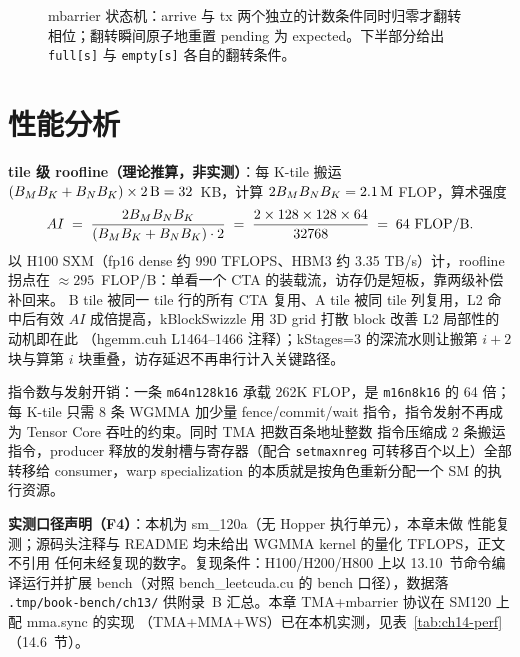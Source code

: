 \begin{figure}[htbp]
\caption{mbarrier 状态机：arrive 与 tx 两个独立的计数条件同时归零才翻转相位；翻转瞬间原子地重置 pending 为 expected。下半部分给出 \texttt{full[s]} 与 \texttt{empty[s]} 各自的翻转条件。}
\label{fig:13-3}
\end{figure}

\section{性能分析}

\textbf{tile 级 roofline（理论推算，非实测）}：每 K-tile 搬运
$(B\sb{M} B\sb{K} + B\sb{N} B\sb{K}) \times 2\,\mathrm{B} = 32$~KB，计算
$2 B\sb{M} B\sb{N} B\sb{K} = 2.1\,\mathrm{M}$ FLOP，算术强度
\begin{equation}
  AI \;=\; \frac{2 B\sb{M} B\sb{N} B\sb{K}}
  {(B\sb{M} B\sb{K} + B\sb{N} B\sb{K}) \cdot 2}
  \;=\; \frac{2 \times 128 \times 128 \times 64}{32768}
  \;=\; 64 \ \mathrm{FLOP/B} .
\end{equation}
以 H100 SXM（fp16 dense 约 990 TFLOPS、HBM3 约 3.35 TB/s）计，roofline 拐点在
$\approx 295$~FLOP/B：单看一个 CTA 的装载流，访存仍是短板，靠两级补偿补回来。
B tile 被同一 tile 行的所有 CTA 复用、A tile 被同 tile 列复用，L2 命中后有效
$AI$ 成倍提高，kBlockSwizzle 用 3D grid 打散 block 改善 L2 局部性的动机即在此
（hgemm.cuh L1464--1466 注释）；kStages=3 的深流水则让搬第 $i{+}2$ 块与算第
$i$ 块重叠，访存延迟不再串行计入关键路径。

指令数与发射开销：一条 \texttt{m64n128k16} 承载 262K FLOP，是
\texttt{m16n8k16} 的 64 倍；每 K-tile 只需 8 条 WGMMA 加少量 fence/commit/wait
指令，指令发射不再成为 Tensor Core 吞吐的约束。同时 TMA 把数百条地址整数
指令压缩成 2 条搬运指令，producer 释放的发射槽与寄存器（配合
\texttt{setmaxnreg} 可转移百个以上）全部转移给 consumer，warp specialization
的本质就是按角色重新分配一个 SM 的执行资源。

\textbf{实测口径声明（F4）}：本机为 sm\_120a（无 Hopper 执行单元），本章未做
性能复测；源码头注释与 README 均未给出 WGMMA kernel 的量化 TFLOPS，正文不引用
任何未经复现的数字。复现条件：H100/H200/H800 上以 13.10~节命令编译运行并扩展
bench（对照 bench\_leetcuda.cu 的 bench 口径），数据落 \texttt{.\allowbreak{}tmp/\allowbreak{}book-bench/\allowbreak{}ch13/\allowbreak{}}
供附录~B 汇总。本章 TMA+mbarrier 协议在 SM120 上配 mma.sync 的实现
（TMA+MMA+WS）已在本机实测，见表~\ref{tab:ch14-perf}（14.6~节）。

